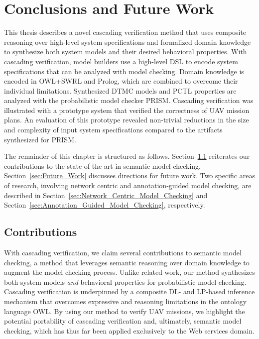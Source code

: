\chapter{Conclusions and Future Work}
\label{chap:Conclusions_and_Future_Work}

This thesis describes a novel cascading verification method that uses composite reasoning over high-level system specifications and formalized domain knowledge to synthesize both system models and their desired behavioral properties. With cascading verification, model builders use a high-level DSL to encode system specifications that can be analyzed with model checking. Domain knowledge is encoded in OWL+SWRL and Prolog, which are combined to overcome their individual limitations. Synthesized DTMC models and PCTL properties are analyzed with the probabilistic model checker PRISM\@. Cascading verification was illustrated with a prototype system that verified the correctness of UAV mission plans. An evaluation of this prototype revealed non-trivial reductions in the size and complexity of input system specifications compared to the artifacts synthesized for PRISM\@.

The remainder of this chapter is structured as follows. Section~\ref{sec:Contributions} reiterates our contributions to the state of the art in semantic model checking. Section~\ref{sec:Future_Work} discusses directions for future work. Two specific areas of research, involving network centric and annotation-guided model checking, are described in Section~\ref{sec:Network_Centric_Model_Checking} and Section~\ref{sec:Annotation_Guided_Model_Checking}, respectively.

\section{Contributions}
\label{sec:Contributions}

With cascading verification, we claim several contributions to semantic model checking, a method that leverages semantic reasoning over domain knowledge to augment the model checking process. Unlike related work, our method synthesizes both system models \emph{and} behavioral properties for probabilistic model checking. Cascading verification is underpinned by a composite DL- and LP-based inference mechanism that overcomes expressive and reasoning limitations in the ontology language OWL\@. By using our method to verify UAV missions, we highlight the potential portability of cascading verification and, ultimately, semantic model checking, which has thus far been applied exclusively to the Web services domain.

